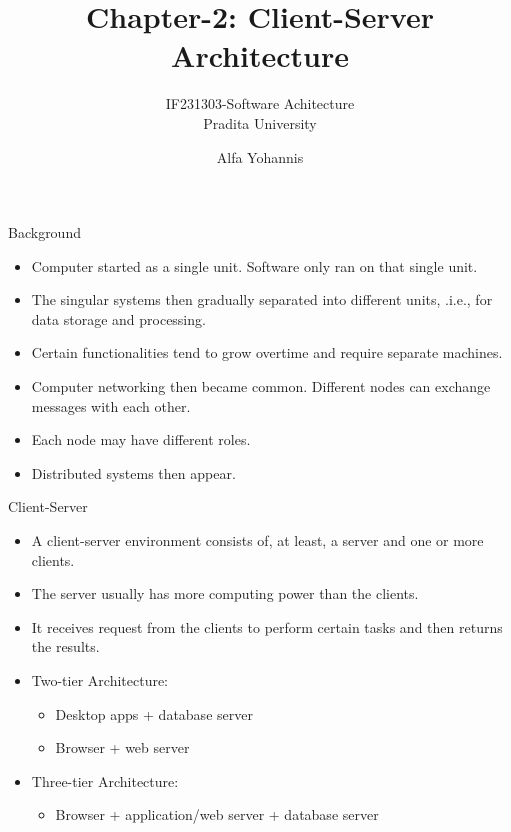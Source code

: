 \documentclass{beamer}
\title{Chapter-2: Client-Server Architecture}
\subtitle{IF231303-Software Achitecture\\Pradita University}
\author{Alfa Yohannis}
\begin{document}
\begin{frame}[plain]
    \maketitle
\end{frame}

\begin{frame}{Background}
\begin{itemize}
\item Computer started as a single unit.  Software only ran on that single unit.
\item The singular systems then gradually separated into different units, .i.e., for data storage and processing.
\item Certain functionalities tend to grow overtime and require separate machines.
\item Computer networking then became common. Different nodes can exchange messages with each other.
\item Each node may have different roles.
\item Distributed systems then appear.
\end{itemize}
\end{frame}

\begin{frame}{Client-Server}
\begin{itemize}
\item A client-server environment consists of, at least, a server and one or more clients.
\item The server usually has more computing power than the clients. 
\item It receives request from the clients to perform certain tasks and then returns the results.
\item Two-tier Architecture:
\begin{itemize}
\item Desktop apps + database server
\item Browser + web server
\end{itemize}
\item Three-tier Architecture:
\begin{itemize}
\item Browser + application/web server + database server
\end{itemize}
\end{itemize}
\end{frame}
\end{document}
